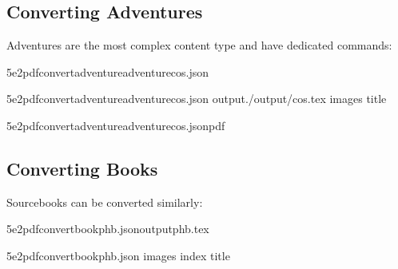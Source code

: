 \documentclass[letterpaper,10pt,english]{sphinxmanual}
\begin{document}
\subsection{Converting Adventures}
\label{\detokenize{user-guide/quickstart:converting-adventures}}
\sphinxAtStartPar
Adventures are the most complex content type and have dedicated commands:

\begin{sphinxVerbatim}[commandchars=\\\{\}]
5e2pdfconvertadventureadventure\PYGZhy{}cos.json

5e2pdfconvertadventureadventure\PYGZhy{}cos.json
\PYGZhy{}\PYGZhy{}output./output/cos.tex
\PYGZhy{}\PYGZhy{}images
\PYGZhy{}\PYGZhy{}title

5e2pdfconvertadventureadventure\PYGZhy{}cos.json\PYGZhy{}\PYGZhy{}pdf
\end{sphinxVerbatim}


\subsection{Converting Books}
\label{\detokenize{user-guide/quickstart:converting-books}}
\sphinxAtStartPar
Sourcebooks can be converted similarly:

\begin{sphinxVerbatim}[commandchars=\\\{\}]
5e2pdfconvertbookphb.json\PYGZhy{}\PYGZhy{}outputphb.tex

5e2pdfconvertbookphb.json
\PYGZhy{}\PYGZhy{}images
\PYGZhy{}\PYGZhy{}index
\PYGZhy{}\PYGZhy{}title
\end{sphinxVerbatim}
\end{document}
